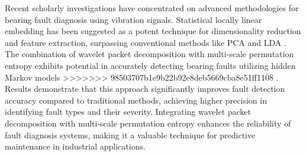 \documentclass[sn-basic,pdflatex]{sn-jnl}
\theoremstyle{remark}
\theoremstyle{definition}
\begin{document}
Recent scholarly investigations have concentrated on advanced
methodologies for bearing fault diagnosis using vibration signals.
Statistical locally linear embedding has been suggested as a potent
technique for dimensionality reduction and feature extraction,
surpassing conventional methods like PCA and LDA
\citep{WOS:000361788200068}. The combination of wavelet packet
decomposition with multi-scale permutation entropy exhibits potential in
accurately detecting bearing faults utilizing hidden Markov models
>>>>>>> 98503707b1e9b22b92e8deb5669cba8e51ff1108
\citep{WOS:000362513400031}. Results demonstrate that this approach
significantly improves fault detection accuracy compared to traditional
methods, achieving higher precision in identifying fault types and their
severity. Integrating wavelet packet decomposition with multi-scale
permutation entropy enhances the reliability of fault diagnosis systems,
making it a valuable technique for predictive maintenance in industrial
applications.
\end{document}
